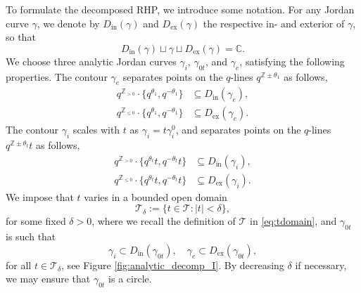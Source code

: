\documentclass[a4paper,reqno,11pt]{amsart}
\numberwithin{equation}{section}
\numberwithin{figure}{section}
\theoremstyle{plain}
\theoremstyle{remark}
\numberwithin{rhp}{section}
\begin{document}
To formulate the decomposed RHP, we introduce some notation. For any Jordan curve $\gamma$, we denote by $D_{\text{in}}(\gamma)$ and $D_{\text{ex}}(\gamma)$ the respective in- and exterior of $\gamma$, so that
\begin{equation*}
    D_{\text{in}}(\gamma)\sqcup \gamma\sqcup D_{\text{ex}}(\gamma)=\mathbb{C}.
\end{equation*}
We choose three analytic Jordan curves $\gamma_i$, $\gamma_{0t}$, and $\gamma_e$, satisfying the following properties.
The contour $\gamma_e$ separates points on the $q$-lines $q^{\mathbb{Z}\pm\theta_1}$ as follows,
\begin{align*}
q^{\mathbb{Z}_{>0}}\cdot \{q^{\theta_1},q^{-\theta_1}\}&\subseteq D_{\text{in}}(\gamma_{e}),\\
q^{\mathbb{Z}_{\leq 0}}\cdot \{q^{\theta_1},q^{-\theta_1}\}&\subseteq D_{\text{ex}}(\gamma_{e}).
\end{align*}
The contour $\gamma_i$ scales with $t$ as $\gamma_i=t \gamma_i^0$, and separates points on the $q$-lines $q^{\mathbb{Z}\pm\theta_t}t$ as follows,
\begin{align*}
q^{\mathbb{Z}_{>0}}\cdot \{q^{\theta_t} t,q^{-\theta_t} t\}&\subseteq D_{\text{in}}(\gamma_{i}),\\
q^{\mathbb{Z}_{\leq 0}}\cdot \{q^{\theta_t} t,q^{-\theta_t} t\}&\subseteq D_{\text{ex}}(\gamma_{i}).
\end{align*}
We impose that $t$ varies in a bounded open domain
\begin{equation}\label{eq:Tdelta}
    \mathcal{T}_{\delta}:=\{t\in \mathcal{T}: |t|<\delta\},
\end{equation}
for some fixed $\delta>0$, where we recall the definition of $\mathcal{T}$ in \eqref{eq:tdomain}, and $\gamma_{0t}$ is such that
\begin{equation*}
    \gamma_i\subset D_{\text{in}}(\gamma_{0t}),\quad \gamma_e\subset D_{\text{ex}}(\gamma_{0t}),
\end{equation*}
for all $t\in \mathcal{T}_\delta$, see Figure \ref{fig:analytic_decomp_I}. By decreasing $\delta$ if necessary, we may ensure that $\gamma_{0t}$ is a circle.
\end{document}
